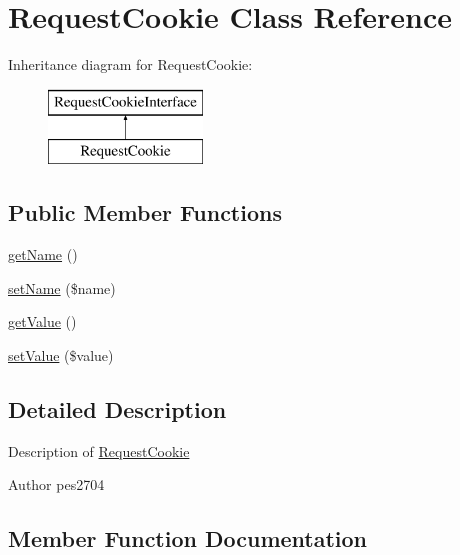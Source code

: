\hypertarget{class_pes_1_1_http_1_1_cookies_1_1_request_cookie}{}\section{Request\+Cookie Class Reference}
\label{class_pes_1_1_http_1_1_cookies_1_1_request_cookie}
Inheritance diagram for Request\+Cookie\+:\begin{figure}[H]
\begin{center}
\leavevmode
\includegraphics[height=2.000000cm]{class_pes_1_1_http_1_1_cookies_1_1_request_cookie}
\end{center}
\end{figure}
\subsection*{Public Member Functions}
\begin{DoxyCompactItemize}
\item 
\mbox{\hyperlink{class_pes_1_1_http_1_1_cookies_1_1_request_cookie_a3d0963e68bb313b163a73f2803c64600}{get\+Name}} ()
\item 
\mbox{\hyperlink{class_pes_1_1_http_1_1_cookies_1_1_request_cookie_a2fe666694997d047711d7653eca2f132}{set\+Name}} (\$name)
\item 
\mbox{\hyperlink{class_pes_1_1_http_1_1_cookies_1_1_request_cookie_ac0bc18784b182c89fcfd276625aef435}{get\+Value}} ()
\item 
\mbox{\hyperlink{class_pes_1_1_http_1_1_cookies_1_1_request_cookie_a7494441b6ed08a391704971873f31432}{set\+Value}} (\$value)
\end{DoxyCompactItemize}


\subsection{Detailed Description}
Description of \mbox{\hyperlink{class_pes_1_1_http_1_1_cookies_1_1_request_cookie}{Request\+Cookie}}

\begin{DoxyAuthor}{Author}
pes2704 
\end{DoxyAuthor}


\subsection{Member Function Documentation}
\mbox{\label{class_pes_1_1_http_1_1_cookies_1_1_request_cookie_a3d0963e68bb313b163a73f2803c64600}} 
